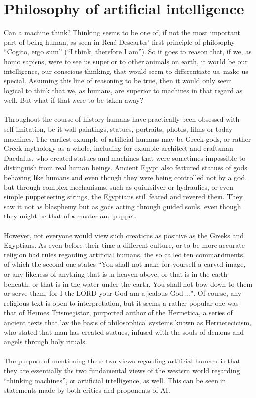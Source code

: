 \section{Philosophy of artificial intelligence}
Can a machine think? Thinking seems to be one of, if not the most important part of being human, as seen in René Descartes’ first principle of philosophy “Cogito, ergo sum” (“I think, therefore I am”). So it goes to reason that, if we, as homo sapiens, were to see us superior to other animals on earth, it would be our intelligence, our conscious thinking, that would seem to differentiate us, make us special. Assuming this line of reasoning to be true, then it would only seem logical to think that we, as humans, are superior to machines in that regard as well. But what if that were to be taken away?
\\
\\
Throughout the course of history humans have practically been obsessed with self-imitation, be it wall-paintings, statues, portraits, photos, films or today machines. The earliest example of artificial humans may be Greek gods, or rather Greek mythology as a whole, including for example architect and craftsman Daedalus, who created statues and machines that were sometimes impossible to distinguish from real human beings. Ancient Egypt also featured statues of gods behaving like humans and even though they were being controlled not by a god, but through complex mechanisms, such as quicksilver or hydraulics, or even simple puppeteering strings, the Egyptians still feared and revered them. They saw it not as blasphemy but as gods acting through guided souls, even though they might be that of a master and puppet.
\\
\\
However, not everyone would view such creations as positive as the Greeks and Egyptians. As even before their time a different culture, or to be more accurate religion had rules regarding artificial humans, the so called ten commandments, of which the second one states “You shall not make for yourself a carved image, or any likeness of anything that is in heaven above, or that is in the earth beneath, or that is in the water under the earth. You shall not bow down to them or serve them, for I the LORD your God am a jealous God ...". Of course, any religious text is open to interpretation, but it seems a rather popular one was that of Hermes Trismegistor, purported author of the Hermetica, a series of ancient texts that lay the basis of philosophical systems known as Hermetecicism, who stated that man has created statues, infused with the souls of demons and angels through holy rituals.
\\
\\
The purpose of mentioning these two views regarding artificial humans is that they are essentially the two fundamental views of the western world regarding “thinking machines”, or artificial intelligence, as well. This can be seen in statements made by both critics and proponents of AI. 

